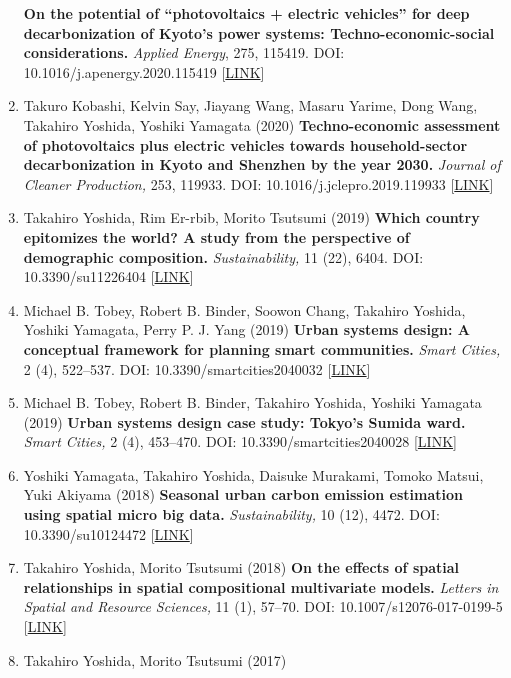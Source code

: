 \documentclass[
]{book}
\begin{document}
\begin{enumerate}
  \textbf{On the potential of ``photovoltaics + electric vehicles'' for deep decarbonization of Kyoto's power systems: Techno-economic-social considerations.}
  \emph{Applied Energy}, 275, 115419.
  DOI: 10.1016/j.apenergy.2020.115419 {[}\href{https://doi.org/10.1016/j.apenergy.2020.115419}{LINK}{]}
\item
  Takuro Kobashi, Kelvin Say, Jiayang Wang, Masaru Yarime, Dong Wang, Takahiro Yoshida, Yoshiki Yamagata (2020)
  \textbf{Techno-economic assessment of photovoltaics plus electric vehicles towards household-sector decarbonization in Kyoto and Shenzhen by the year 2030.}
  \emph{Journal of Cleaner Production,} 253, 119933.
  DOI: 10.1016/j.jclepro.2019.119933 {[}\href{https://doi.org/10.1016/j.jclepro.2019.119933}{LINK}{]}
\item
  Takahiro Yoshida, Rim Er-rbib, Morito Tsutsumi (2019)
  \textbf{Which country epitomizes the world? A study from the perspective of demographic composition.}
  \emph{Sustainability,} 11 (22), 6404.
  DOI: 10.3390/su11226404 {[}\href{https://www.mdpi.com/2071-1050/11/22/6404}{LINK}{]}
\item
  Michael B. Tobey, Robert B. Binder, Soowon Chang, Takahiro Yoshida, Yoshiki Yamagata, Perry P. J. Yang (2019)
  \textbf{Urban systems design: A conceptual framework for planning smart communities.}
  \emph{Smart Cities,} 2 (4), 522--537.
  DOI: 10.3390/smartcities2040032 {[}\href{https://www.mdpi.com/2624-6511/2/4/32}{LINK}{]}
\item
  Michael B. Tobey, Robert B. Binder, Takahiro Yoshida, Yoshiki Yamagata (2019)
  \textbf{Urban systems design case study: Tokyo's Sumida ward.}
  \emph{Smart Cities,} 2 (4), 453--470.
  DOI: 10.3390/smartcities2040028 {[}\href{https://www.mdpi.com/2624-6511/2/4/28}{LINK}{]}
\item
  Yoshiki Yamagata, Takahiro Yoshida, Daisuke Murakami, Tomoko Matsui, Yuki Akiyama (2018)
  \textbf{Seasonal urban carbon emission estimation using spatial micro big data.}
  \emph{Sustainability,} 10 (12), 4472.
  DOI: 10.3390/su10124472 {[}\href{https://www.mdpi.com/2071-1050/10/12/4472}{LINK}{]}
\item
  Takahiro Yoshida, Morito Tsutsumi (2018)
  \textbf{On the effects of spatial relationships in spatial compositional multivariate models.}
  \emph{Letters in Spatial and Resource Sciences,} 11 (1), 57--70.
  DOI: 10.1007/s12076-017-0199-5 {[}\href{https://link.springer.com/article/10.1007/s12076-017-0199-5}{LINK}{]}
\item
  Takahiro Yoshida, Morito Tsutsumi (2017)

\end{enumerate}
\end{document}
